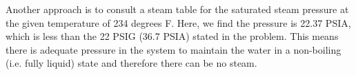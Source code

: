 \vskip 10pt

Another approach is to consult a steam table for the saturated steam pressure at the given temperature of 234 degrees F.  Here, we find the pressure is 22.37 PSIA, which is less than the 22 PSIG (36.7 PSIA) stated in the problem.  This means there is adequate pressure in the system to maintain the water in a non-boiling (i.e. fully liquid) state and therefore there can be no steam.






